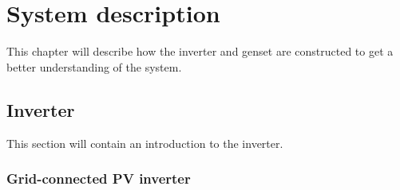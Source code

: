 
\chapter{System description}

This chapter will describe how the inverter and genset are constructed to get a better understanding of the system. 

\section{Inverter}
This section will contain an introduction to the inverter.

\subsection{Grid-connected PV inverter}
\label{PVinverter}

